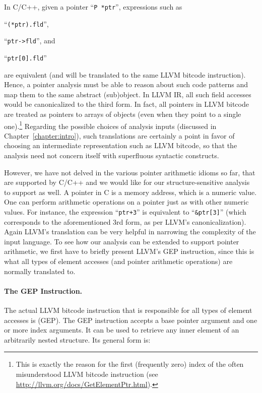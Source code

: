 In C/C++, given a pointer ``\texttt{P *ptr}'', expressions
such as
\begin{inparaenum}[(i)]
\item ``\texttt{(*ptr).fld}'',
\item ``\texttt{ptr->fld}'', and
\item ``\texttt{ptr[0].fld}''
\end{inparaenum}
are equivalent (and will be translated to the same LLVM bitcode
instruction). Hence, a pointer analysis must be able to reason about
such code patterns and map them to the same abstract (sub)object. In
LLVM IR, all such field accesses would be canonicalized to the third
form. In fact, all pointers in LLVM bitcode are treated as pointers to
arrays of objects (even when they point to a single
one).\footnote{This is exactly the reason for the first (frequently
  zero) index of the often misunderstood  LLVM
  bitcode instruction (see
  \url{http://llvm.org/docs/GetElementPtr.html}).}  Regarding the
possible choices of analysis inputs (discussed in
Chapter~\ref{chapter:intro}), such translations are certainly a point
in favor of choosing an intermediate representation such as LLVM
bitcode, so that the analysis need not concern itself with superfluous
syntactic constructs.

However, we have not delved in the various pointer arithmetic idioms
so far, that are supported by C/C++ and we would like for our
structure-sensitive analysis to support as well. A pointer in C is a
memory address, which is a numeric value. One can perform arithmetic
operations on a pointer just as with other numeric values. For
instance, the expression ``\texttt{ptr+3}'' is equivalent to
``\texttt{&ptr[3]}'' (which corresponds to the aforementioned
3rd form, as per LLVM's canonicalization).  Again LLVM's translation
can be very helpful in narrowing the complexity of the input
language. To see how our analysis can be extended to support pointer
arithmetic, we first have to briefly present LLVM's GEP instruction,
since this is what all types of element accesses (and pointer
arithmetic operations) are normally translated to.

\paragraph{The GEP Instruction.} The actual LLVM bitcode instruction
that is responsible for all types of element accesses is
 (GEP). The GEP instruction accepts a base
pointer argument and one or more index arguments. It can be used to
retrieve any inner element of an arbitrarily nested structure. Its
general form is:

